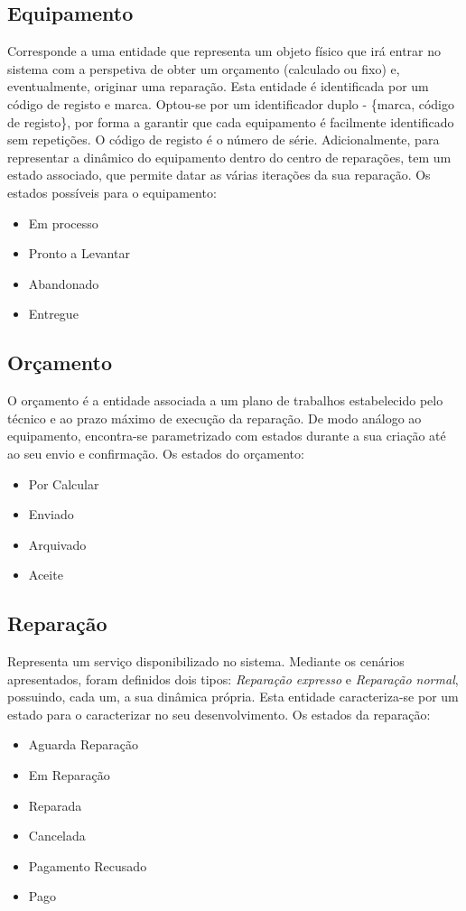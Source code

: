 \documentclass[a4paper,12pt]{scrreprt}
\begin{document}
\subsection{Equipamento} \label{ent_equipamento}
Corresponde a uma entidade que representa um objeto físico que irá entrar no sistema com a perspetiva de obter um orçamento (calculado ou fixo) e,
eventualmente, originar uma reparação.
Esta entidade é identificada por um código de registo e marca.
Optou-se por um identificador duplo - \{marca, código de registo\}, 
por forma a garantir que cada equipamento é facilmente identificado sem repetições.
O código de registo é o número de série.
Adicionalmente, para representar a dinâmico do equipamento dentro do centro de reparações, tem um estado associado, que permite datar as várias 
iterações da sua reparação.
Os estados possíveis para o equipamento:
\begin{itemize}
    \item Em processo
    \item Pronto a Levantar
    \item Abandonado
    \item Entregue
\end{itemize}

\subsection{Orçamento} \label{ent_orcamento}
O orçamento é a entidade associada a um plano de trabalhos estabelecido pelo técnico e ao prazo máximo de execução da reparação.
De modo análogo ao equipamento, encontra-se parametrizado com estados durante a sua criação até ao seu envio e confirmação.
Os estados do orçamento:
\begin{itemize}
    \item Por Calcular
    \item Enviado
    \item Arquivado
    \item Aceite
\end{itemize}

\subsection{Reparação} \label{ent_reparacao}
Representa um serviço disponibilizado no sistema. 
Mediante os cenários apresentados, foram definidos dois tipos: \textit{Reparação expresso} e \textit{Reparação normal},
possuindo, cada um, a sua dinâmica própria.
Esta entidade caracteriza-se por um estado para o caracterizar no seu desenvolvimento.
Os estados da reparação:
\begin{itemize}
    \item Aguarda Reparação
    \item Em Reparação
    \item Reparada
    \item Cancelada
    \item Pagamento Recusado
    \item Pago
\end{itemize}
\end{document}
